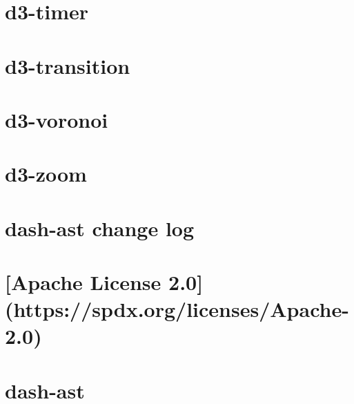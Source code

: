 \documentclass[twoside]{book}
\newcommand{\+}{\discretionary{\mbox{\scriptsize$\hookleftarrow$}}{}{}}
\begin{document}
\chapter{d3-\/timer}
\label{md_dsmacc_examples_DRmerge_node_modules_d3-timer_README}

\chapter{d3-\/transition}
\label{md_dsmacc_examples_DRmerge_node_modules_d3-transition_README}

\chapter{d3-\/voronoi}
\label{md_dsmacc_examples_DRmerge_node_modules_d3-voronoi_README}

\chapter{d3-\/zoom}
\label{md_dsmacc_examples_DRmerge_node_modules_d3-zoom_README}

\chapter{dash-\/ast change log}
\label{md_dsmacc_examples_DRmerge_node_modules_dash-ast_CHANGELOG}

\chapter{\mbox{[}Apache License 2.0\mbox{]}(https\+://spdx.org/licenses/\+Apache-\/2.0)}
\label{md_dsmacc_examples_DRmerge_node_modules_dash-ast_LICENSE}

\chapter{dash-\/ast}
\label{md_dsmacc_examples_DRmerge_node_modules_dash-ast_README}

\end{document}
